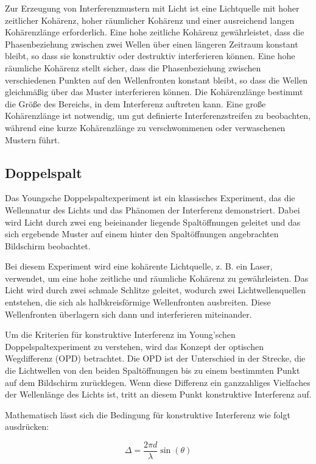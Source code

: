 \documentclass[12pt,english,ngerman]{scrartcl}
\begin{document}
Zur Erzeugung von Interferenzmustern mit Licht ist eine Lichtquelle mit hoher
zeitlicher Kohärenz, hoher räumlicher Kohärenz und einer ausreichend langen
Kohärenzlänge erforderlich. Eine hohe zeitliche Kohärenz gewährleistet, dass
die Phasenbeziehung zwischen zwei Wellen über einen längeren Zeitraum konstant
bleibt, so dass sie konstruktiv oder destruktiv interferieren können. Eine hohe
räumliche Kohärenz stellt sicher, dass die Phasenbeziehung zwischen
verschiedenen Punkten auf den Wellenfronten konstant bleibt, so dass die Wellen
gleichmäßig über das Muster interferieren können. Die Kohärenzlänge bestimmt
die Größe des Bereichs, in dem Interferenz auftreten kann. Eine große
Kohärenzlänge ist notwendig, um gut definierte Interferenzstreifen zu
beobachten, während eine kurze Kohärenzlänge zu verschwommenen oder
verwaschenen Mustern führt.

\subsection{Doppelspalt}

Das Youngsche Doppelspaltexperiment ist ein klassisches Experiment, das die
Wellennatur des Lichts und das Phänomen der Interferenz demonstriert. Dabei
wird Licht durch zwei eng beieinander liegende Spaltöffnungen geleitet und das
sich ergebende Muster auf einem hinter den Spaltöffnungen angebrachten
Bildschirm beobachtet.

Bei diesem Experiment wird eine kohärente Lichtquelle, z. B. ein Laser,
verwendet, um eine hohe zeitliche und räumliche Kohärenz zu gewährleisten. Das
Licht wird durch zwei schmale Schlitze geleitet, wodurch zwei
Lichtwellenquellen entstehen, die sich als halbkreisförmige Wellenfronten
ausbreiten. Diese Wellenfronten überlagern sich dann und interferieren
miteinander.

Um die Kriterien für konstruktive Interferenz im Young'schen
Doppelspaltexperiment zu verstehen, wird das Konzept der optischen
Wegdifferenz (OPD) betrachtet. Die OPD ist der Unterschied in der Strecke, die die
Lichtwellen von den beiden Spaltöffnungen bis zu einem bestimmten Punkt auf dem
Bildschirm zurücklegen. Wenn diese Differenz ein ganzzahliges Vielfaches der
Wellenlänge des Lichts ist, tritt an diesem Punkt konstruktive Interferenz auf.

Mathematisch lässt sich die Bedingung für konstruktive Interferenz wie folgt
ausdrücken:

\begin{equation}
	\Delta = \frac{2\pi d}{\lambda}\sin(\theta)
\end{equation}
\end{document}
